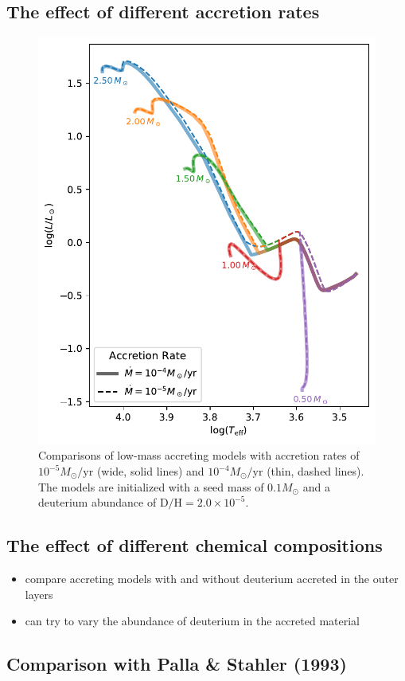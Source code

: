 \documentclass[12pt,a4paper]{article}
\newcommand{\mr}{\mathrm}
\newenvironment{outline}[1]{%
  \begin{itemize}[label=\textbullet]%
  \color{#1}%
}{%
  \end{itemize}%
}
\begin{document}
\subsection{The effect of different accretion rates}
\label{sec:accretion_rate}

\begin{figure}
  \centering  
  \includegraphics[width=.65\textwidth,keepaspectratio]{comp_accrate.pdf}
  \caption{Comparisons of low-mass accreting models with accretion rates of $10^{-5} M_\odot/\mr{yr}$ (wide, solid lines) and $10^{-4} M_\odot/\mr{yr}$ (thin, dashed lines). The models are initialized with a seed mass of $0.1 M_\odot$ and a deuterium abundance of $\mr{D/H} = 2.0\times 10^{-5}$.} \label{fig:comp_accrate}
\end{figure}

\subsection{The effect of different chemical compositions}
\label{sec:chemical_composition}

\begin{outline}{gray}
  \item compare accreting models with and without deuterium accreted in the outer layers
  \item can try to vary the abundance of deuterium in the accreted material
\end{outline}

\subsection{Comparison with Palla \& Stahler (1993)}
\label{sec:comp_palla_stahler}
\end{document}
